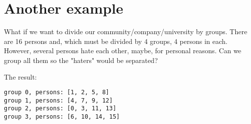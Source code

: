 \section{Another example}

What if we want to divide our community/company/university by groups.
There are 16 persons and, which must be divided by 4 groups, 4 persons in each.
However, several persons hate each other, maybe, for personal reasons.
Can we group all them so the "haters" would be separated?



The result:

\begin{lstlisting}
group 0, persons: [1, 2, 5, 8]
group 1, persons: [4, 7, 9, 12]
group 2, persons: [0, 3, 11, 13]
group 3, persons: [6, 10, 14, 15]
\end{lstlisting}

